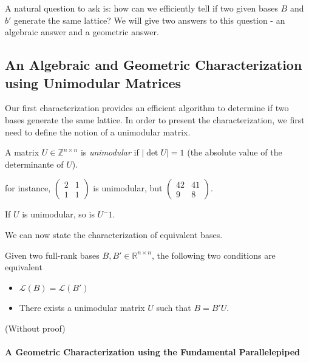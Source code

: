 A natural question to ask is: how can we efficiently tell if two given bases $B$ and $b'$ generate the same lattice?
We will give two answers to this question - an algebraic answer and a geometric answer.

\subsection{An Algebraic and Geometric Characterization using Unimodular Matrices}
Our first characterization provides an efficient algorithm to determine if two bases generate the same
lattice. In order to present the characterization, we first need to define the notion of a unimodular matrix.


\begin{definition}
    A matrix $U\in \mathbb{Z}^{n\times n}$ is \emph{unimodular} if $| \det{U} |=1$ (the absolute value of the determinante of $U$).
\end{definition}

for instance, $\left(\begin{matrix}2 & 1\\
1 & 1
\end{matrix}\right)$ is unimodular, but $\left(\begin{matrix}42 & 41\\
    9 & 8
\end{matrix}\right) $.

\begin{proposition}
    If $U$ is unimodular, so is $U^-1$.
\end{proposition}

We can now state the characterization of equivalent bases.

\begin{theorem}
Given two full-rank bases $B,B'\in \mathbb{R}^{n\times n}$, the following two conditions are equivalent 
    \begin{itemize}
        \item $\mathcal{L}(B)=\mathcal{L}(B')$
        \item There exists a unimodular matrix $U$ such that $B=B'U$.
    \end{itemize}

    (Without proof)
\end{theorem}


\paragraph{A Geometric Characterization using the Fundamental Parallelepiped}
